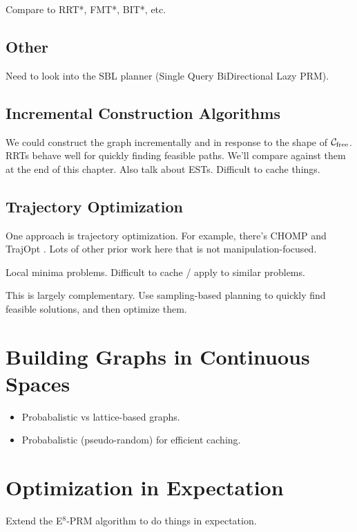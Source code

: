 Compare to RRT*, FMT*, BIT*, etc.

\subsection{Other}

Need to look into the SBL planner \cite{sanchezante2001sbl}
(Single Query BiDirectional Lazy PRM).

\subsection{Incremental Construction Algorithms}

We could construct the graph incrementally and in response to the shape
of $\mathcal{C}_{\mbox{\scriptsize free}}$.
RRTs behave well for quickly finding feasible paths.
We'll compare against them at the end of this chapter.
Also talk about ESTs.
Difficult to cache things.

\subsection{Trajectory Optimization}

One approach is trajectory optimization.
For example, there's CHOMP \cite{zucker2013chomp}
and TrajOpt \cite{schulman2013trajopt}.
Lots of other prior work here that is not manipulation-focused.

Local minima problems.
Difficult to cache / apply to similar problems.

This is largely complementary.
Use sampling-based planning to quickly find feasible solutions,
and then optimize them.

\section{Building Graphs in Continuous Spaces}

\begin{itemize}
\item Probabalistic vs lattice-based graphs.
\item Probabalistic (pseudo-random) for efficient caching.
\end{itemize}

\section{Optimization in Expectation}

Extend the E$^8$-PRM algorithm to do things in expectation.

